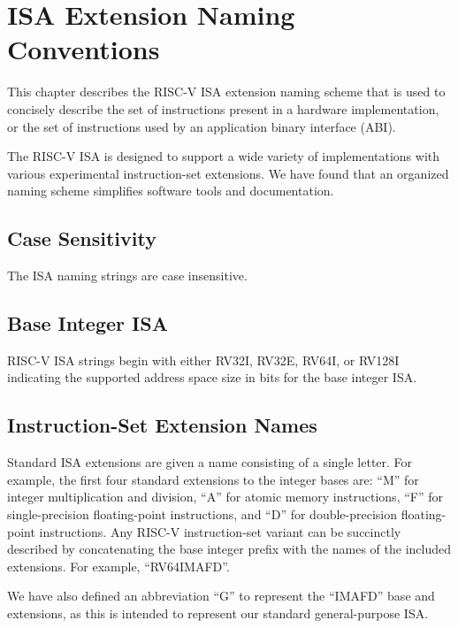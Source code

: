 \chapter{ISA Extension Naming Conventions}
\label{naming}

This chapter describes the RISC-V ISA extension naming scheme that is
used to concisely describe the set of instructions present in a
hardware implementation, or the set of instructions used by an
application binary interface (ABI).

\begin{commentary}
The RISC-V ISA is designed to support a wide variety of
implementations with various experimental instruction-set extensions.
We have found that an organized naming scheme simplifies software
tools and documentation.
\end{commentary}

\section{Case Sensitivity}

The ISA naming strings are case insensitive.

\section{Base Integer ISA}
RISC-V ISA strings begin with either RV32I, RV32E, RV64I, or RV128I
indicating the supported address space size in bits for the base
integer ISA.

\section{Instruction-Set Extension Names}

Standard ISA extensions are given a name consisting of a single
letter.  For example, the first four standard
extensions to the integer bases are:
``M'' for integer multiplication and division,
``A'' for atomic memory instructions,
``F'' for single-precision floating-point instructions, and
``D'' for double-precision floating-point instructions.
Any RISC-V instruction-set variant can be succinctly described by
concatenating the base integer prefix with the names of the included
extensions.  For example, ``RV64IMAFD''.

We have also defined an abbreviation ``G'' to represent the ``IMAFD''
base and extensions, as this is intended to represent our standard
general-purpose ISA.

